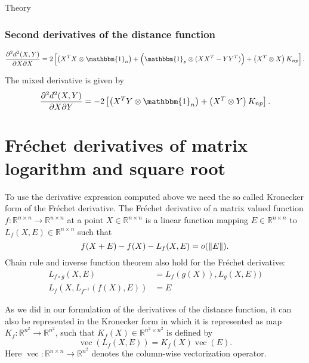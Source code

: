 \begin{chapter}{Theory}

\subsubsection{Second derivatives of the distance function} %
\label{ssub:Second derivatives of the distance function}

\begin{equation}
    \label{eq:gr_xx_der}
    \frac{\partial^2 d^2(X,Y)}{\partial X\partial X} = 2
    \left[
	\left(X^TX\otimes \mathbbm{1}_{n}\right) 
	+ \left(\mathbbm{1}_p\otimes (XX^T-YY^T)\right)
	+ \left(X^T\otimes X\right)K_{np}
    \right].
\end{equation}

The mixed derivative is given by
\begin{equation}
    \label{eq:gr_xy_der}
    \frac{\partial^2 d^2(X,Y)}{\partial X\partial Y} = -2\left[\left(X^TY\otimes \mathbbm{1}_{n}\right) + \left(X^T\otimes Y\right)K_{np}\right].
\end{equation}






\section{Fr\'{e}chet derivatives of matrix logarithm and square root} %
\label{sec:frechetderivatives}
To use the derivative expression computed above we need the so called Kronecker form of the Fr\'{e}chet derivative. The Fr\'{e}chet derivative
of a matrix valued function $f:\mathbb{R}^{n\times n}\to\mathbb{R}^{n\times n}$ at a point $X\in\mathbb{R}^{n\times n}$ is a linear function mapping $E\in\mathbb{R}^{n\times n}$
to $L_f(X,E)\in \mathbb{R}^{n\times n}$ such that
\begin{equation}
    f(X+E) - f(X) - L_f(X,E) = o(\| E \|).
\end{equation}
Chain rule and inverse function theorem also hold for the Fr\'{e}chet derivative:
\begin{align}
    L_{f\circ g}(X, E) &= L_{f}(g(X)),L_{g}(X,E))\\
    L_{f}(X, L_{f^{-1}}(f(X),E)) &= E
\end{align}

As we did in our formulation of the derivatives of the distance function, it can also be represented in the Kronecker form in which it is represented as map
$K_f:\mathbb{R}^{n^2}\to\mathbb{R}^{n^2}$, such that $K_f(X)\in \mathbb{R}^{n^2\times n^2}$ is defined by
\begin{equation}
    \label{eq:kronckerform}
    \operatorname{vec}(L_f(X,E))=K_f(X)\operatorname{vec}(E).
\end{equation}
Here $\operatorname{vec}:\mathbb{R}^{n\times n}\to\mathbb{R}^{n^2}$ denotes the column-wise vectorization operator.


\end{chapter}

